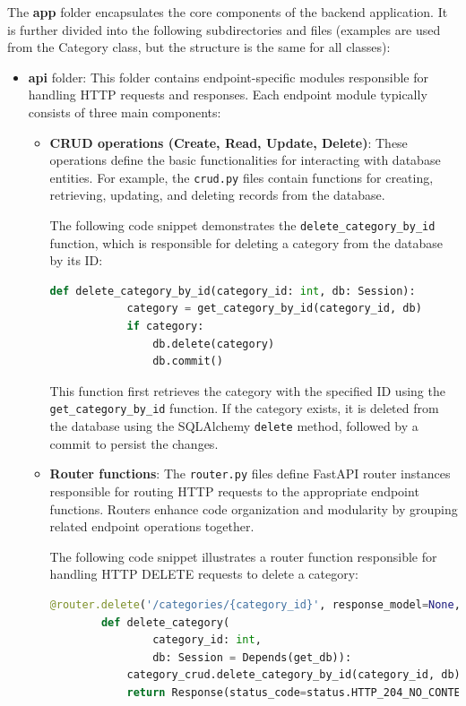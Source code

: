 The \textbf{app} folder encapsulates the core components of the backend application. It is further divided into the following subdirectories and files (examples are used from the Category class, but the structure is the same for all classes):

\begin{itemize}
    \item \textbf{api} folder: This folder contains endpoint-specific modules responsible for handling HTTP requests and responses. Each endpoint module typically consists of three main components:

    \begin{itemize}
        \item \textbf{CRUD operations (Create, Read, Update, Delete)}: These operations define the basic functionalities for interacting with database entities. For example, the \texttt{crud.py} files contain functions for creating, retrieving, updating, and deleting records from the database.

        The following code snippet demonstrates the \texttt{delete\_category\_by\_id} function, which is responsible for deleting a category from the database by its ID:

        \begin{lstlisting}[language=Python]
        def delete_category_by_id(category_id: int, db: Session):
            category = get_category_by_id(category_id, db)
            if category:
                db.delete(category)
                db.commit()
        \end{lstlisting}

        This function first retrieves the category with the specified ID using the \texttt{get\_category\_by\_id} function. If the category exists, it is deleted from the database using the SQLAlchemy \texttt{delete} method, followed by a commit to persist the changes.


        \item \textbf{Router functions}: The \texttt{router.py} files define FastAPI router instances responsible for routing HTTP requests to the appropriate endpoint functions. Routers enhance code organization and modularity by grouping related endpoint operations together.

        The following code snippet illustrates a router function responsible for handling HTTP DELETE requests to delete a category:

        \begin{lstlisting}[language=Python]
        @router.delete('/categories/{category_id}', response_model=None, tags=['category'])
        def delete_category(
                category_id: int,
                db: Session = Depends(get_db)):
            category_crud.delete_category_by_id(category_id, db)
            return Response(status_code=status.HTTP_204_NO_CONTENT)
        \end{lstlisting}


\end{itemize}
\end{itemize}

